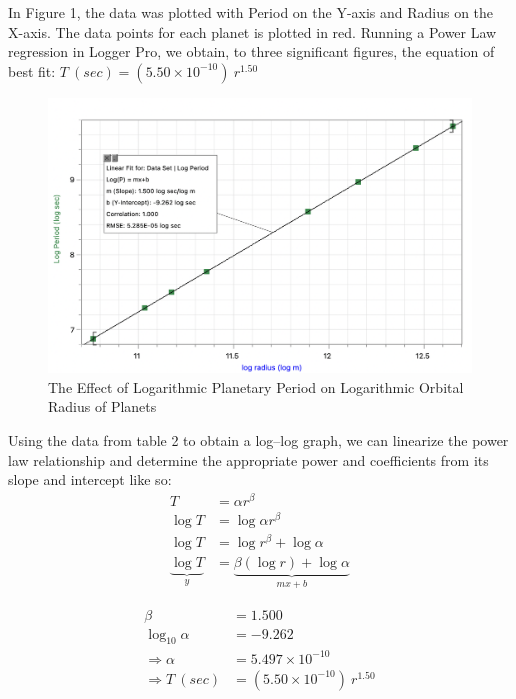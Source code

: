 \documentclass[12pt]{article}
\begin{document}
In Figure 1, the data was plotted with Period on the Y-axis and Radius on the X-axis.  The data points for each planet is plotted in red. Running a Power Law regression in Logger Pro, we obtain, to three significant figures, the equation of best fit: $ T\  (sec) = (5.50\times 10^{-10})\  r^{1.50} $
\pagebreak
\begin{figure}[h]
\begin{center}
\hspace*{-1cm} \includegraphics[scale=.60]{log graph} 
\caption{The Effect of Logarithmic Planetary Period on Logarithmic Orbital Radius of Planets}
\end{center}
\end{figure}

Using the data from table 2 to obtain a log–log graph, we can linearize the power law relationship and determine the appropriate power and coefficients from its slope and intercept like so:
\begin{align*}
T &= \alpha r^{\beta} \\
\log{T} &= \log{\alpha r^{\beta}} \\
\log{T} &= \log{ r^{\beta}}  +  \log{\alpha} \\
\underbrace{\log{T}}_{y} &= \underbrace{ \beta ( \log{ r}) + \log{\alpha} }_{mx + b}
\end{align*}

\begin{align*}
\beta &= 1.500 \\
\log_{10}{\alpha} &= -9.262 \\
\Rightarrow \alpha &= 5.497 \times 10^{-10} \\
\Rightarrow T\ (sec) &= (5.50 \times 10^{-10}) \ r^{1.50}
\end{align*}
\end{document}

